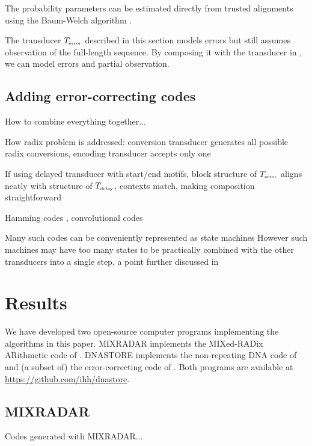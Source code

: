 \documentclass[english]{article}
\begin{document}
The probability parameters can be estimated directly from trusted alignments using the Baum-Welch algorithm \cite{Durbin98}.

The transducer $T_{\mbox{\tiny error}}$
described in this section models errors but still assumes observation of the full-length sequence.
By composing it with the transducer in , we can model errors and partial observation.

\subsection{Adding error-correcting codes}

How to combine everything together...

How radix problem is addressed: conversion transducer generates all possible radix conversions, encoding transducer accepts only one

If using delayed transducer with start/end motifs,
block structure of $T_{\mbox{\tiny error}}$ aligns neatly with structure of $T_{\mbox{\tiny delay}}$,
contexts match,
making composition straightforward

Hamming codes , convolutional codes %

Many such codes can be conveniently represented as state machines
However such machines may have too many states to be practically combined with the other transducers into a single step,
a point further discussed in 

\section{Results}

We have developed two open-source computer programs implementing the algorithms in this paper.
MIXRADAR implements the MIXed-RADix ARithmetic code of .
DNASTORE implements the non-repeating DNA code of 
and (a subset of) the error-correcting code of .
Both programs are available at \url{https://github.com/ihh/dnastore}.

\subsection{MIXRADAR}

Codes generated with MIXRADAR...

\end{document}
